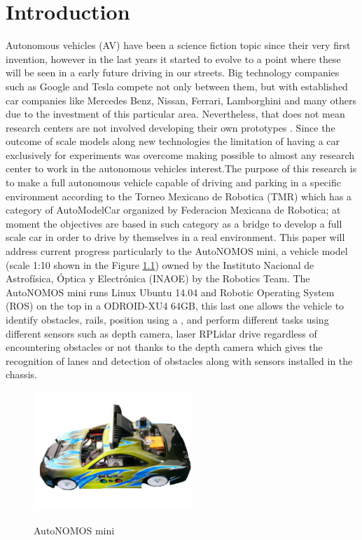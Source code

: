 \chapter{Introduction}
\label{cha:chapter 1}
Autonomous vehicles (AV) have been a science fiction topic since their very first invention, however in the last years it started to evolve to a point where these will be seen in a early future driving in our streets. Big technology companies such as Google and Tesla compete not only between them, but with established car companies like Mercedes Benz, Nissan, Ferrari, Lamborghini and many others due to the investment of this particular area. Nevertheless, that does not mean research centers are not involved developing their own prototypes \cite{ModellingAutonomousVehicles}. Since the outcome of scale models along new technologies the limitation of having a car exclusively for experiments was overcome making possible to almost any research center to work in the autonomous vehicles interest.The purpose of this research is to make a full autonomous vehicle capable of driving and parking in a specific environment according to the Torneo Mexicano de Robotica (TMR) which has a category of AutoModelCar organized by Federacion Mexicana de Robotica; at moment the objectives are based in such category\cite{AutoModelCarRuleBook2019} as a bridge to develop a full scale car in order to drive by themselves in a real environment. This paper will address current progress particularly to the AutoNOMOS  mini, a vehicle model (scale 1:10 shown in the Figure \ref{fig:AutoNOMOS_mini}) owned by the Instituto Nacional de Astrofísica, Óptica y Electrónica (INAOE) by the Robotics Team. The AutoNOMOS mini runs Linux Ubuntu 14.04 and Robotic Operating System (ROS) on the top in a ODROID-XU4 64GB, this last one allows the vehicle to identify obstacles, rails, position using a , and perform different tasks using different sensors such as depth camera, laser RPLidar drive regardless of encountering obstacles or not thanks to the depth camera which gives the recognition of lanes and detection of obstacles along with sensors installed in the chassis.
\begin{figure}[h]
    \centering
    \includegraphics[width=6cm]{Figures/AutoNOMOS.jpg} \\[2mm]
    \caption{AutoNOMOS mini}
    \label{fig:AutoNOMOS_mini}
\end{figure}

